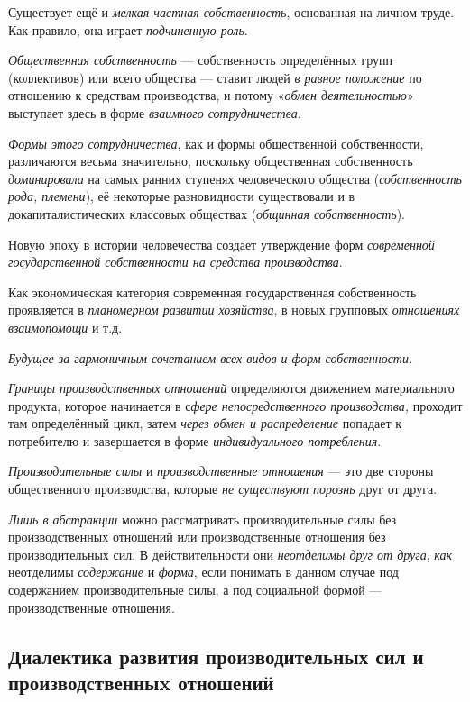 \documentclass[a4paper,14pt,russian]{extreport}
\begin{document}
Существует ещё и \emph{мелкая частная собственность}, основанная на личном труде. Как правило, она играет \emph{подчиненную роль}.

\emph{Общественная собственность} --- собственность определённых групп (коллективов) или всего общества --- ставит людей \emph{в равное положение} по отношению к средствам производства, и потому «\emph{обмен деятельностью}» выступает здесь в форме \emph{взаимного сотрудничества}.

\emph{Формы этого сотрудничества}, как и формы общественной собственности, различаются весьма значительно, поскольку общественная собственность \emph{доминировала} на самых ранних ступенях человеческого общества (\emph{собственность рода, племени}), её некоторые разновидности существовали и в докапиталистических классовых обществах (\emph{общинная собственность}).

Новую эпоху в истории человечества создает утверждение форм \emph{современной государственной собственности на средства производства}.

Как экономическая категория современная государственная собственность проявляется в \emph{планомерном развитии хозяйства}, в новых групповых \emph{отношениях взаимопомощи} и т.д.

\emph{Будущее за гармоничным сочетанием всех видов и форм собственности.}

\emph{Границы производственных отношений} определяются движением материального продукта, которое начинается в с\emph{фере непосредственного производства,} проходит там определённый цикл, затем \emph{через обмен и распределение} попадает к потребителю и завершается в форме \emph{индивидуального потребления}.

\emph{Производительные силы} и \emph{производственные отношения} --- это две стороны общественного производства, которые \emph{не существуют порознь} друг от друга.

\emph{Лишь в абстракции} можно рассматривать производительные силы без производственных отношений или производственные отношения без производительных сил. В действительности они \emph{неотделимы друг от друга}, \emph{как} неотделимы \emph{содержание} и \emph{форма}, если понимать в данном случае под содержанием производительные силы, а под социальной формой --- производственные отношения.

\subsection{Диалектика развития производительных сил и производственныx отношений}
\end{document}
